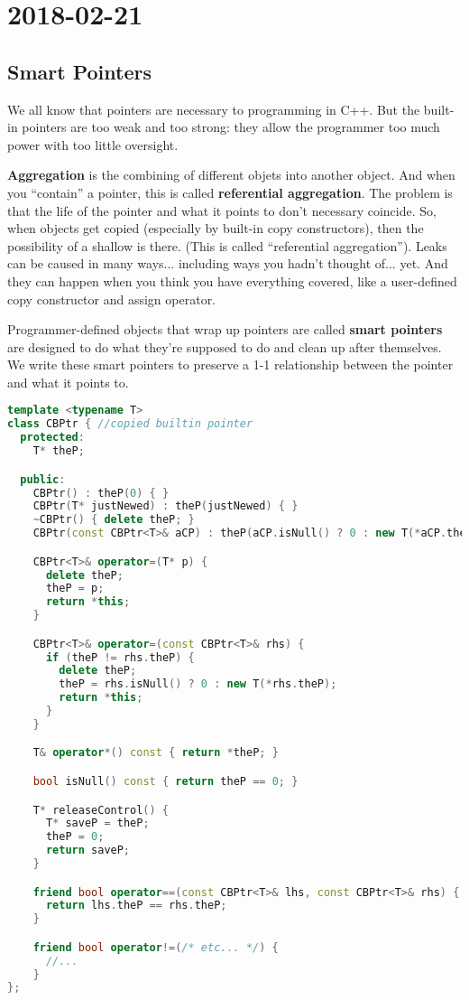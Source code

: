 \section{2018-02-21}

\subsection{Smart Pointers}

We all know that pointers are necessary to programming in C++. But the built-in pointers are too weak and too strong: they allow the programmer too much power with too little oversight.

\textbf{Aggregation} is the combining of different objets into another object. And when you ``contain'' a pointer, this is called \textbf{referential aggregation}. The problem is that the life of the pointer and what it points to don't necessary coincide. So, when objects get copied (especially by built-in copy constructors), then the possibility of a shallow is there. (This is called ``referential aggregation''). Leaks can be caused in many ways... including ways you hadn't thought of... yet. And they can happen when you think you have everything covered, like a user-defined copy constructor and assign operator.

Programmer-defined objects that wrap up pointers are called \textbf{smart pointers} are designed to do what they're supposed to do and clean up after themselves. We write these smart pointers to preserve a 1-1 relationship between the pointer and what it points to.

\begin{lstlisting}[language=C++]
template <typename T>
class CBPtr { //copied builtin pointer
  protected:
    T* theP;

  public:
    CBPtr() : theP(0) { }
    CBPtr(T* justNewed) : theP(justNewed) { }
    ~CBPtr() { delete theP; }
    CBPtr(const CBPtr<T>& aCP) : theP(aCP.isNull() ? 0 : new T(*aCP.theP)) { }

    CBPtr<T>& operator=(T* p) {
      delete theP;
      theP = p;
      return *this;
    }

    CBPtr<T>& operator=(const CBPtr<T>& rhs) {
      if (theP != rhs.theP) {
        delete theP;
        theP = rhs.isNull() ? 0 : new T(*rhs.theP);
        return *this;
      }
    }

    T& operator*() const { return *theP; }

    bool isNull() const { return theP == 0; }

    T* releaseControl() {
      T* saveP = theP;
      theP = 0;
      return saveP;
    }

    friend bool operator==(const CBPtr<T>& lhs, const CBPtr<T>& rhs) {
      return lhs.theP == rhs.theP;
    }

    friend bool operator!=(/* etc... */) {
      //...
    }
};
\end{lstlisting}


